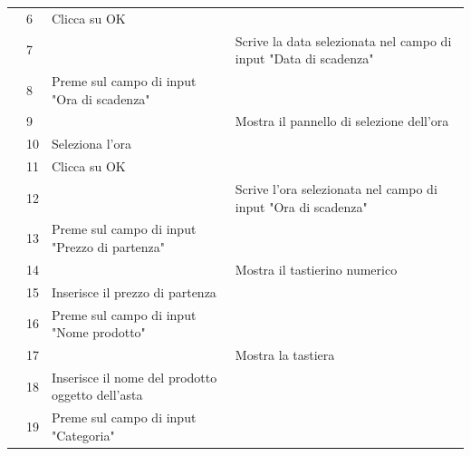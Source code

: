 \begin{longtable}{|C{3.0cm}|C{1.3cm}|L{5.2cm}|L{5.2cm}|}
                        & 6
                        & Clicca su OK
                        & \\
                        & 7
                        & 
                        & Scrive la data selezionata nel campo di input "Data di scadenza"\\
                        & 8
                        & Preme sul campo di input "Ora di scadenza"
                        & \\
                        & 9
                        & 
                        & Mostra il pannello di selezione dell'ora\\
                        & 10
                        & Seleziona l'ora
                        & \\
                        & 11
                        & Clicca su OK
                        & \\
                        & 12
                        & 
                        & Scrive l'ora selezionata nel campo di input "Ora di scadenza"\\
                        & 13
                        & Preme sul campo di input "Prezzo di partenza"
                        & \\
                        & 14
                        &
                        & Mostra il tastierino numerico \\
                        & 15
                        & Inserisce il prezzo di partenza
                        & \\
                        & 16
                        & Preme sul campo di input "Nome prodotto"
                        & \\
                        & 17
                        &
                        & Mostra la tastiera \\
                        & 18
                        & Inserisce il nome del prodotto oggetto dell'asta
                        & \\
                        & 19
                        & Preme sul campo di input "Categoria"
                        & \\

\end{longtable}
